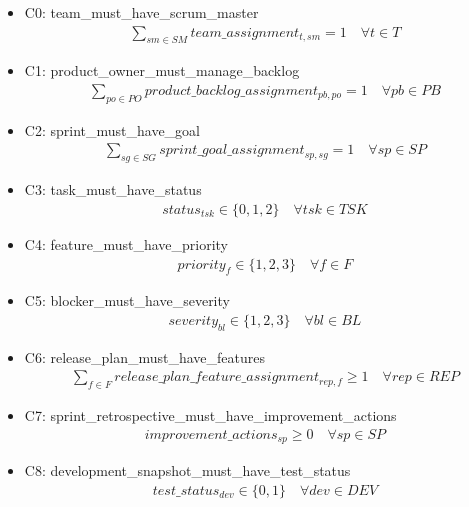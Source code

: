 \documentclass{article}
\begin{document}
\begin{itemize}
    \item C0: team\_must\_have\_scrum\_master
        \begin{align*}
            \sum_{sm \in SM} team\_assignment_{t, sm} = 1 \quad \forall t \in T
        \end{align*}
    \item C1: product\_owner\_must\_manage\_backlog
        \begin{align*}
            \sum_{po \in PO} product\_backlog\_assignment_{pb, po} = 1 \quad \forall pb \in PB
        \end{align*}
    \item C2: sprint\_must\_have\_goal
        \begin{align*}
            \sum_{sg \in SG} sprint\_goal\_assignment_{sp, sg} = 1 \quad \forall sp \in SP
        \end{align*}
    \item C3: task\_must\_have\_status
        \begin{align*}
            status_{tsk} \in \{0, 1, 2\} \quad \forall tsk \in TSK
        \end{align*}
    \item C4: feature\_must\_have\_priority
        \begin{align*}
            priority_{f} \in \{1, 2, 3\} \quad \forall f \in F
        \end{align*}
    \item C5: blocker\_must\_have\_severity
        \begin{align*}
            severity_{bl} \in \{1, 2, 3\} \quad \forall bl \in BL
        \end{align*}
    \item C6: release\_plan\_must\_have\_features
        \begin{align*}
            \sum_{f \in F} release\_plan\_feature\_assignment_{rep, f} \geq 1 \quad \forall rep \in REP
        \end{align*}
    \item C7: sprint\_retrospective\_must\_have\_improvement\_actions
        \begin{align*}
            improvement\_actions_{sp} \geq 0 \quad \forall sp \in SP
        \end{align*}
    \item C8: development\_snapshot\_must\_have\_test\_status
        \begin{align*}
            test\_status_{dev} \in \{0, 1\} \quad \forall dev \in DEV

\end{align*}
\end{itemize}
\end{document}
